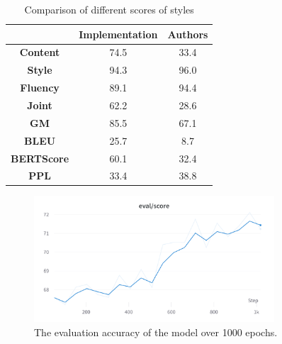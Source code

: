 \documentclass[akbc,twoside,11pt]{article}
\begin{document}
\begin{table}[h]
\centering
\begin{tabular}{|c|c|c|}
\hline
 & \textbf{Implementation} & \textbf{Authors} \\ \hline
\textbf{Content} & 74.5 & 33.4 \\ \hline
\textbf{Style} & 94.3 & 96.0 \\ \hline
\textbf{Fluency} & 89.1 & 94.4 \\ \hline
\textbf{Joint} & 62.2 & 28.6 \\ \hline
\textbf{GM} & 85.5 & 67.1 \\ \hline
\textbf{BLEU} & 25.7 & 8.7 \\ \hline
\textbf{BERTScore} & 60.1 & 32.4 \\ \hline
\textbf{PPL} & 33.4 & 38.8 \\ \hline
\end{tabular}
\caption{\label{tab:kashyap} Comparison of different scores of styles}
\end{table}

\begin{figure}[h]
    \centering
    \includegraphics[width=0.8\textwidth]{assets/eval_accuracy_kashyap}
    \caption{The evaluation accuracy of the model over 1000 epochs.}
    \label{fig:evalkashyap}
\end{figure}
\end{document}
